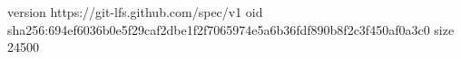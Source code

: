 version https://git-lfs.github.com/spec/v1
oid sha256:694ef6036b0e5f29caf2dbe1f2f7065974e5a6b36fdf890b8f2c3f450af0a3c0
size 24500
